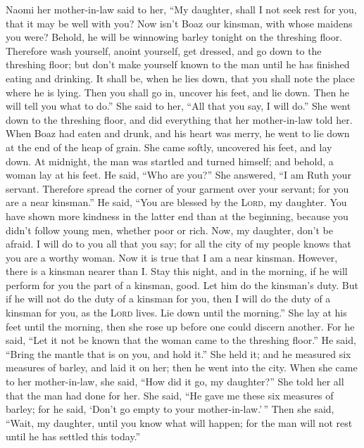  Naomi her mother-in-law said to her, ``My daughter, shall
I not seek rest for you, that it may be well with you? 
Now isn't Boaz our kinsman, with whose maidens you were? Behold, he will
be winnowing barley tonight on the threshing floor. 
Therefore wash yourself, anoint yourself, get dressed, and go down to
the threshing floor; but don't make yourself known to the man until he
has finished eating and drinking.  It shall be, when he
lies down, that you shall note the place where he is lying. Then you
shall go in, uncover his feet, and lie down. Then he will tell you what
to do.''  She said to her, ``All that you say, I will
do.''  She went down to the threshing floor, and did
everything that her mother-in-law told her.  When Boaz had
eaten and drunk, and his heart was merry, he went to lie down at the end
of the heap of grain. She came softly, uncovered his feet, and lay down.
 At midnight, the man was startled and turned himself; and
behold, a woman lay at his feet.  He said, ``Who are
you?'' She answered, ``I am Ruth your servant. Therefore spread the
corner of your garment over your servant; for you are a near kinsman.''
 He said, ``You are blessed by the \textsc{Lord}, my
daughter. You have shown more kindness in the latter end than at the
beginning, because you didn't follow young men, whether poor or rich.
 Now, my daughter, don't be afraid. I will do to you all
that you say; for all the city of my people knows that you are a worthy
woman.  Now it is true that I am a near kinsman. However,
there is a kinsman nearer than I.  Stay this night, and
in the morning, if he will perform for you the part of a kinsman, good.
Let him do the kinsman's duty. But if he will not do the duty of a
kinsman for you, then I will do the duty of a kinsman for you, as the
\textsc{Lord} lives. Lie down until the morning.''  She
lay at his feet until the morning, then she rose up before one could
discern another. For he said, ``Let it not be known that the woman came
to the threshing floor.''  He said, ``Bring the mantle
that is on you, and hold it.'' She held it; and he measured six measures
of barley, and laid it on her; then he went into the city.
 When she came to her mother-in-law, she said, ``How did
it go, my daughter?'' She told her all that the man had done for her.
 She said, ``He gave me these six measures of barley; for
he said, `Don't go empty to your mother-in-law.'\,'' 
Then she said, ``Wait, my daughter, until you know what will happen; for
the man will not rest until he has settled this today.''

